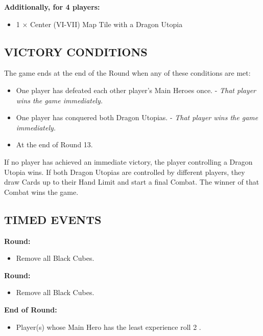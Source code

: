 \begin{multicols*}{2}
\textbf{Additionally, for 4 players:}
\begin{itemize}
  \item 1 × Center (VI-VII) Map Tile with a Dragon Utopia
\end{itemize}

\subsection*{\MakeUppercase{Victory Conditions}}
The game ends at the end of the Round when any of these conditions are met:

\begin{itemize}
 \item One player has defeated each other player's Main Heroes once. - \textit{That player wins the game immediately.}
 \item One player has conquered both Dragon Utopias. - \textit{That player wins the game immediately.}
 \item At the end of Round 13.
\end{itemize}

If no player has achieved an immediate victory, the player controlling a Dragon Utopia wins. If both Dragon Utopias are controlled by different players, they draw Cards up to their Hand Limit and start a final Combat. The winner of that Combat wins the game.
\subsection*{\MakeUppercase{Timed Events}}

\textbf{ Round:}
\begin{itemize}
  \item Remove all Black Cubes.
\end{itemize}
\textbf{ Round:}
\begin{itemize}
  \item Remove all Black Cubes.
\end{itemize}
\textbf{End of  Round:}
\begin{itemize}
  \item Player(s) whose Main Hero has the least experience roll 2 .
\end{itemize}


\end{multicols*}
